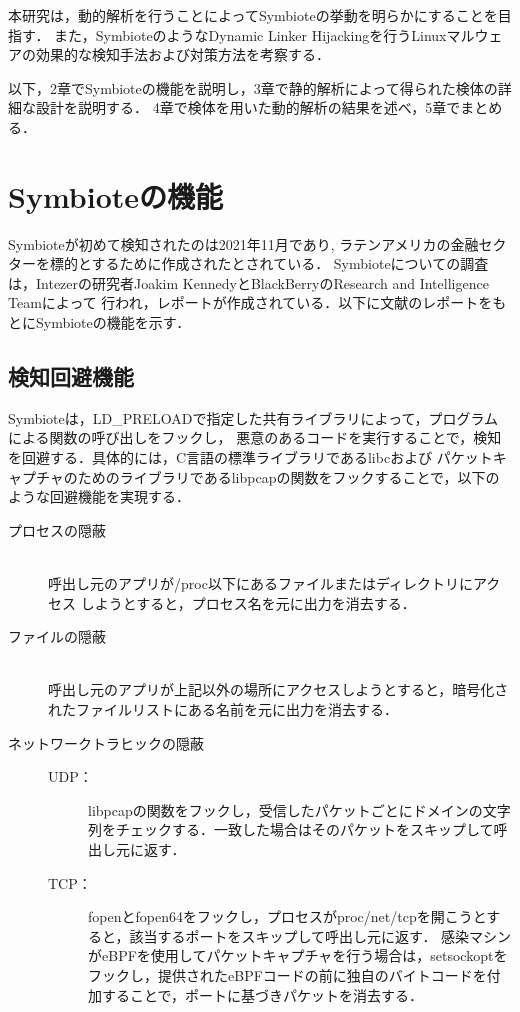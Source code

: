 \documentclass[submit,techreq,noauthor]{eco}	%
\begin{document}
本研究は，動的解析を行うことによってSymbioteの挙動を明らかにすることを目指す．
また，SymbioteのようなDynamic Linker Hijackingを行うLinuxマルウェアの効果的な検知手法および対策方法を考察する．


以下，2章でSymbioteの機能を説明し，3章で静的解析によって得られた検体の詳細な設計を説明する．
4章で検体を用いた動的解析の結果を述べ，5章でまとめる．\\


\section{Symbioteの機能}
Symbioteが初めて検知されたのは2021年11月であり,
ラテンアメリカの金融セクターを標的とするために作成されたとされている．
Symbioteについての調査は，Intezerの研究者Joakim KennedyとBlackBerryのResearch and Intelligence Teamによって
行われ，レポートが作成されている．以下に文献\cite{Symbiote}のレポートをもとにSymbioteの機能を示す．


\subsection{検知回避機能}
Symbioteは，LD\_PRELOADで指定した共有ライブラリによって，プログラムによる関数の呼び出しをフックし，
悪意のあるコードを実行することで，検知を回避する．具体的には，C言語の標準ライブラリであるlibcおよび
パケットキャプチャのためのライブラリであるlibpcapの関数をフックすることで，以下のような回避機能を実現する．
  \begin{description}
    \item [プロセスの隠蔽] \mbox{}\\
    呼出し元のアプリが/proc以下にあるファイルまたはディレクトリにアクセス
    しようとすると，プロセス名を元に出力を消去する．
    \item [ファイルの隠蔽] \mbox{}\\
    呼出し元のアプリが上記以外の場所にアクセスしようとすると，暗号化さ
    れたファイルリストにある名前を元に出力を消去する．
    \item [ネットワークトラヒックの隠蔽] \mbox{}
      \begin{description}
        \item[UDP：] 
        libpcapの関数をフックし，受信したパケットごとにドメインの文字列をチェックする．一致した場合はそのパケットをスキップして呼出し元に返す．
        \item[TCP：] 
        fopenとfopen64をフックし，プロセスがproc/net/tcpを開こうとすると，該当するポートをスキップして呼出し元に返す．
        感染マシンがeBPFを使用してパケットキャプチャを行う場合は，setsockoptをフックし，提供されたeBPFコードの前に独自のバイトコードを付加することで，ポートに基づきパケットを消去する．
      \end{description}
  \end{description}
\end{document}
